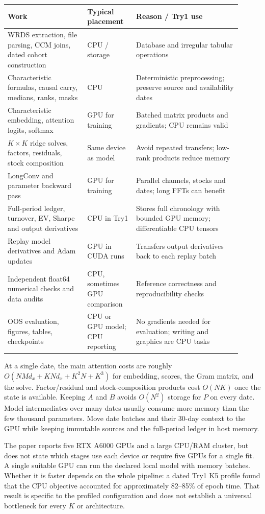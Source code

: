 \documentclass[11pt]{article}
\begin{document}
\begin{center}
\small
\begin{tabular}{p{0.31\linewidth}p{0.19\linewidth}p{0.41\linewidth}}
\toprule
Work & Typical placement & Reason / Try1 use\\
\midrule
WRDS extraction, file parsing, CCM joins, dated cohort construction
& CPU / storage & Database and irregular tabular operations\\
Characteristic formulas, causal carry, medians, ranks, masks
& CPU & Deterministic preprocessing; preserve source and availability dates\\
Characteristic embedding, attention logits, softmax
& GPU for training & Batched matrix products and gradients; CPU remains valid\\
$K\times K$ ridge solves, factors, residuals, stock composition
& Same device as model & Avoid repeated transfers; low-rank products reduce memory\\
LongConv and parameter backward pass
& GPU for training & Parallel channels, stocks and dates; long FFTs can benefit\\
Full-period ledger, turnover, EV, Sharpe and output derivatives
& CPU in Try1 & Stores full chronology with bounded GPU memory; differentiable CPU tensors\\
Replay model derivatives and Adam updates
& GPU in CUDA runs & Transfers output derivatives back to each replay batch\\
Independent float64 numerical checks and data audits
& CPU, sometimes GPU comparison & Reference correctness and reproducibility checks\\
OOS evaluation, figures, tables, checkpoints
& CPU or GPU model; CPU reporting & No gradients needed for evaluation; writing and graphics are CPU tasks\\
\bottomrule
\end{tabular}
\end{center}

At a single date, the main attention costs are roughly
$O(NMd_x+KNd_x+K^2N+K^3)$ for embedding, scores, the Gram matrix,
and the solve. Factor/residual and stock-composition products cost
$O(NK)$ once the state is available. Keeping $A$ and $B$ avoids
$O(N^2)$ storage for $P$ on every date. Model intermediates over many
dates usually consume more memory than the few thousand parameters.
Move date batches and their 30-day context to the GPU while keeping
immutable sources and the full-period ledger in host memory.

The paper reports five RTX A6000 GPUs and a large CPU/RAM cluster,
but does not state which stages use each device or require five GPUs
for a single fit. A single suitable GPU can run the declared local
model with memory batches. Whether it is faster depends on the
whole pipeline: a dated Try1 K5 profile found that the CPU objective
accounted for approximately 82--85\% of epoch time. That result is
specific to the profiled configuration and does not establish a
universal bottleneck for every $K$ or architecture.
\end{document}
